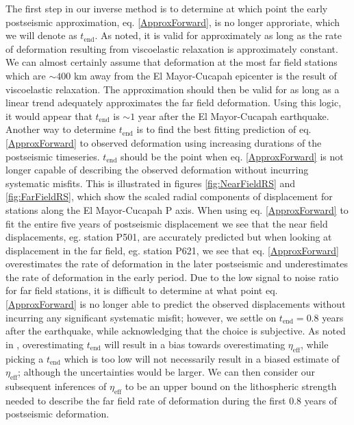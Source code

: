 \documentclass[12pt]{article}
\begin{document}
The first step in our inverse method is to determine at which point the early postseismic approximation, eq. \ref{ApproxForward}, is no longer approriate, which we will denote as $t_{\mathrm{end}}$.  As noted, it is valid for approximately as long as the rate of deformation resulting from viscoelastic relaxation is approximately constant. We can almost certainly assume that deformation at the most far field stations which are $\sim400$ km away from the El Mayor-Cucapah epicenter is the result of viscoelastic relaxation. The approximation should then be valid for as long as a linear trend adequately approximates the far field deformation. Using this logic, it would appear that $t_{\mathrm{end}}$ is $\sim1$ year after the El Mayor-Cucapah earthquake.  Another way to determine $t_{\mathrm{end}}$ is to find the best fitting prediction of eq. \ref{ApproxForward} to observed deformation using increasing durations of the postseismic timeseries.  $t_\mathrm{end}$ should be the point when eq. \ref{ApproxForward} is not longer capable of describing the observed deformation without incurring systematic misfits.  This is illustrated in figures \ref{fig:NearFieldRS} and \ref{fig:FarFieldRS}, which show the scaled radial components of displacement for stations along the El Mayor-Cucapah P axis.  When using eq. \ref{ApproxForward} to fit the entire five years of postseismic displacement we see that the near field displacements, eg. station P501, are accurately predicted but when looking at displacement in the far field, eg. station P621, we see that eq. \ref{ApproxForward} overestimates the rate of deformation in the later postseismic and underestimates the rate of deformation in the early period.  Due to the low signal to noise ratio for far field stations, it is difficult to determine at what point eq. \ref{ApproxForward} is no longer able to predict the observed displacements without incurring any significant systematic misfit; however, we settle on $t_{\mathrm{end}}=0.8$ years after the earthquake, while acknowledging that the choice is subjective. As noted in \cite{Hines2015}, overestimating $t_{\mathrm{end}}$ will result in a bias towards overestimating $\eta_{\mathrm{eff}}$, while picking a $t_\mathrm{end}$ which is too low will not necessarily result in a biased estimate of $\eta_\mathrm{eff}$; although the uncertainties would be larger. We can then consider our subsequent inferences of $\eta_{\mathrm{eff}}$ to be an upper bound on the lithospheric strength needed to describe the far field rate of deformation during the first 0.8 years of postseismic deformation. 
\end{document}
